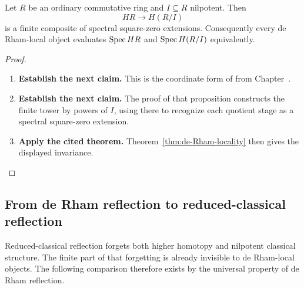 \begin{lemma}
\label{lem:finite-nilpotent-towers-de-Rham}
Let \(R\) be an ordinary commutative ring and \(I\subseteq R\) nilpotent. Then
\[
  HR\longrightarrow H(R/I)
\]
is a finite composite of spectral square-zero extensions. Consequently
every de Rham-local object evaluates \(\operatorname{Spec} HR\) and \(\operatorname{Spec} H(R/I)\)
equivalently.
\end{lemma}

\begin{proof}
\leavevmode
\begin{enumerate}[label=\textup{(\arabic*)}]
    \item \textbf{Establish the next claim.}
    This is the coordinate form of
     from
    Chapter~.
    \item \textbf{Establish the next claim.}
    The proof of that proposition
    constructs the finite tower by powers of \(I\), using
     there to recognize each quotient stage
    as a spectral square-zero extension.
    \item \textbf{Apply the cited theorem.}
    Theorem~\ref{thm:de-Rham-locality} then gives the displayed invariance.
\end{enumerate}
\end{proof}

\subsection{From de Rham reflection to reduced-classical reflection}

Reduced-classical reflection forgets both higher homotopy and nilpotent
classical structure. The finite part of that forgetting is already invisible
to de Rham-local objects. The following comparison therefore exists by the
universal property of de Rham reflection.

